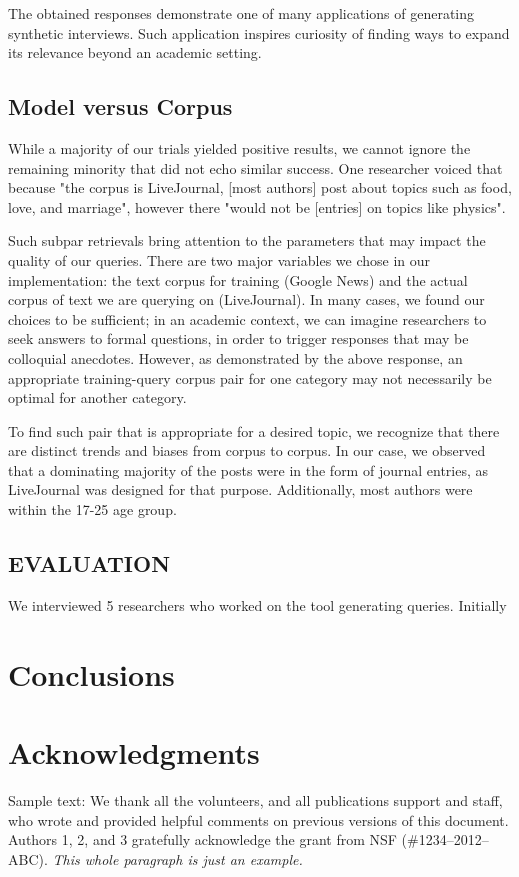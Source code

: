 \documentclass{sigchi}
\begin{document}
The obtained responses demonstrate one of many applications of generating synthetic interviews. Such application inspires curiosity of finding ways to expand its relevance beyond an academic setting. 

\subsection{Model versus Corpus}
While a majority of our trials yielded positive results, we cannot ignore the remaining minority that did not echo similar success. One researcher voiced that because "the corpus is LiveJournal, [most authors] post about topics such as food, love, and marriage", however there "would not be [entries] on topics like physics". 

Such subpar retrievals bring attention to the parameters that may impact the quality of our queries. There are two major variables we chose in our implementation: the text corpus for training (Google News) and the actual corpus of text we are querying on (LiveJournal). In many cases, we found our choices to be sufficient; in an academic context, we can imagine researchers to seek answers to formal questions, in order to trigger responses that may be colloquial anecdotes. However, as demonstrated by the above response, an appropriate training-query corpus pair for one category may not necessarily be optimal for another category.

To find such pair that is appropriate for a desired topic, we recognize that there are distinct trends and biases from corpus to corpus. In our case, we observed that a dominating majority of the posts were in the form of journal entries, as LiveJournal was designed for that purpose. Additionally, most authors were within the 17-25 age group.


\subsection{EVALUATION}
We interviewed 5 researchers who worked on the tool generating queries. Initially

\section{Conclusions}


\section{Acknowledgments}

Sample text: We thank all the volunteers, and all publications support
and staff, who wrote and provided helpful comments on previous
versions of this document. Authors 1, 2, and 3 gratefully acknowledge
the grant from NSF (\#1234--2012--ABC). \textit{This whole paragraph is
  just an example.}




\end{document}
